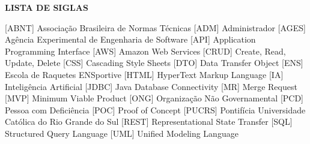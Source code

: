 
\begin{center}
  \uppercase{\bfseries lista de siglas}\\[3em]
\end{center}

\begin{acronym}[TECNOPUC]
     [ABNT]   {Associação Brasileira de Normas Técnicas}
      [ADM]    {Administrador}
     [AGES]   {Agência Experimental de Engenharia de Software}
      [API]    {Application Programming Interface}
      [AWS]    {Amazon Web Services}
     [CRUD]   {Create, Read, Update, Delete}
      [CSS]    {Cascading Style Sheets}
      [DTO]    {Data Transfer Object}
      [ENS]    {Escola de Raquetes ENSportive}
     [HTML]   {HyperText Markup Language}
       [IA]     {Inteligência Artificial}
     [JDBC]   {Java Database Connectivity}
       [MR]     {Merge Request}
      [MVP]    {Minimum Viable Product}
      [ONG]    {Organização Não Governamental}
      [PCD]    {Pessoa com Deficiência}
      [POC]    {Proof of Concept}
    [PUCRS]  {Pontifícia Universidade Católica do Rio Grande do Sul}
     [REST]   {Representational State Transfer}
      [SQL]    {Structured Query Language}
      [UML]    {Unified Modeling Language}
\end{acronym}
